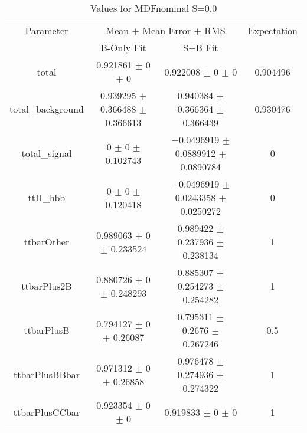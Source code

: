 \begin{table}
\centering
\caption{Values for MDFnominal S=0.0}
\begin{tabular}{cccc}
\toprule
Parameter & \multicolumn{2}{c}{Mean $\pm$ Mean Error $\pm$ RMS} & Expectation\\
 & B-Only Fit & S+B Fit & \\
\midrule
total & \num{0.921861} $\pm$ \num{0} $\pm$ \num{0} & \num{0.922008} $\pm$ \num{0} $\pm$ \num{0} & \num{0.904496}\\
total\_background & \num{0.939295} $\pm$ \num{0.366488} $\pm$ \num{0.366613} & \num{0.940384} $\pm$ \num{0.366364} $\pm$ \num{0.366439} & \num{0.930476}\\
total\_signal & \num{0} $\pm$ \num{0} $\pm$ \num{0.102743} & \num{-0.0496919} $\pm$ \num{0.0889912} $\pm$ \num{0.0890784} & \num{0}\\
ttH\_hbb & \num{0} $\pm$ \num{0} $\pm$ \num{0.120418} & \num{-0.0496919} $\pm$ \num{0.0243358} $\pm$ \num{0.0250272} & \num{0}\\
ttbarOther & \num{0.989063} $\pm$ \num{0} $\pm$ \num{0.233524} & \num{0.989422} $\pm$ \num{0.237936} $\pm$ \num{0.238134} & \num{1}\\
ttbarPlus2B & \num{0.880726} $\pm$ \num{0} $\pm$ \num{0.248293} & \num{0.885307} $\pm$ \num{0.254273} $\pm$ \num{0.254282} & \num{1}\\
ttbarPlusB & \num{0.794127} $\pm$ \num{0} $\pm$ \num{0.26087} & \num{0.795311} $\pm$ \num{0.2676} $\pm$ \num{0.267246} & \num{0.5}\\
ttbarPlusBBbar & \num{0.971312} $\pm$ \num{0} $\pm$ \num{0.26858} & \num{0.976478} $\pm$ \num{0.274936} $\pm$ \num{0.274322} & \num{1}\\
ttbarPlusCCbar & \num{0.923354} $\pm$ \num{0} $\pm$ \num{0} & \num{0.919833} $\pm$ \num{0} $\pm$ \num{0} & \num{1}\\
\bottomrule
\end{tabular}
\end{table}